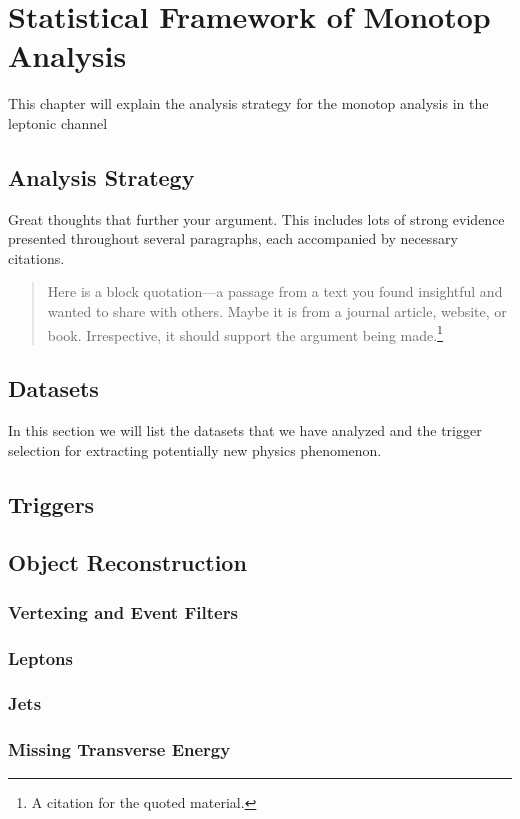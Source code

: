 \chapter{Statistical Framework of Monotop Analysis}
\label{chapter:five}
This chapter will explain the analysis strategy for the monotop analysis in the leptonic channel
\section{Analysis Strategy}

Great thoughts that further your argument. This includes lots of strong evidence presented throughout several paragraphs, each accompanied by necessary citations.
\begin{quotation}
    \noindent Here is a block quotation---a passage from a text you found insightful and wanted to share with others. Maybe it is from a journal article, website, or book. Irrespective, it should support the argument being made.\footnote{A citation for the quoted material.}
\end{quotation}



\section{Datasets}
In this section we will list the datasets that we have analyzed and the trigger selection for extracting potentially new physics phenomenon.
\section{Triggers}
\section{Object Reconstruction}
\subsection{Vertexing and Event Filters}
\subsection{Leptons}
\subsection{Jets}
\subsection{Missing Transverse Energy}



